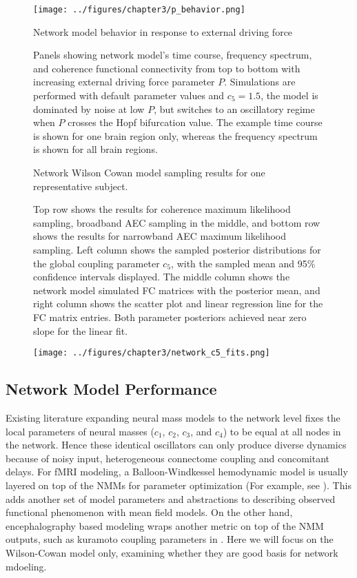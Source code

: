\begin{figure}[htbp]
    \centering
    \texttt{[image: ../figures/chapter3/p\_behavior.png]}
    \caption{Network model behavior in response to external driving force}
    \caption*{Panels showing network model's time course, frequency spectrum, and coherence functional connectivity from top to bottom with increasing external driving force parameter $P$. Simulations are performed with default parameter values and $c_5 = 1.5$, the model is dominated by noise at low $P$, but switches to an oscillatory regime when $P$ crosses the Hopf bifurcation value. The example time course is shown for one brain region only, whereas the frequency spectrum is shown for all brain regions.}
    \label{fig:p_behavior}
\end{figure}

\begin{figure}[htbp]
    \caption{Network Wilson Cowan model sampling results for one representative subject.}
    \caption*{Top row shows the results for coherence maximum likelihood sampling, broadband AEC sampling in the middle, and bottom row shows the results for narrowband AEC maximum likelihood sampling. Left column shows the sampled posterior distributions for the global coupling parameter $c_5$, with the sampled mean and 95\% confidence intervals displayed. The middle column shows the network model simulated FC matrices with the posterior mean, and right column shows the scatter plot and linear regression line for the FC matrix entries. Both parameter posteriors achieved near zero slope for the linear fit.}
    \label{fig:networkc5}
\end{figure}
\clearpage
\begin{figure}[h!]
	\ContinuedFloat
	\captionsetup{labelformat=adja-page}
    \centering
    \texttt{[image: ../figures/chapter3/network\_c5\_fits.png]}
    \caption{}
\end{figure}


\subsection{Network Model Performance}
Existing literature expanding neural mass models to the network level fixes the local parameters of neural masses ($c_1$, $c_2$, $c_3$, and $c_4$) to be equal at all nodes in the network. Hence these identical oscillators can only produce diverse dynamics because of noisy input, heterogeneous connectome coupling and concomitant delays. For fMRI modeling, a Balloon-Windkessel hemodynamic model \cite{buxton_dynamics_1998, friston_nonlinear_2000} is usually layered on top of the NMMs for parameter optimization (For example, see \cite{Zimmermann2018}). This adds another set of model parameters and abstractions to describing observed functional phenomenon with mean field models. On the other hand, encephalography based modeling wraps another metric on top of the NMM outputs, such as kuramoto coupling parameters in \cite{Deco2009}.  Here we will focus on the Wilson-Cowan model only, examining whether they are good basis for network mdoeling.

